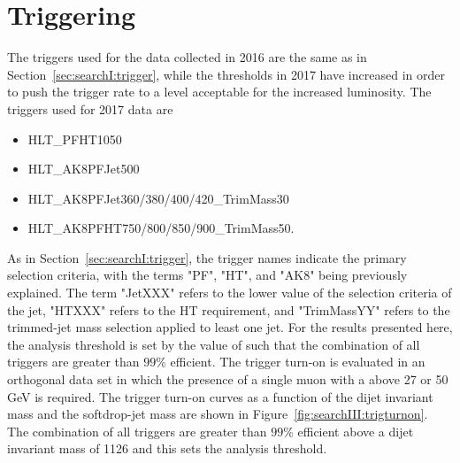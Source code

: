 \section{Triggering}
\label{sec:searchIII:trigger}
The triggers used for the data collected in 2016 are the same as in Section~\ref{sec:searchI:trigger}, while the thresholds in 2017 have increased in order to push the trigger rate to a level acceptable for the increased luminosity. The triggers used for 2017 data are
\begin{itemize}
  \itemsep0em
\item {HLT\_PFHT1050}
\item {HLT\_AK8PFJet500}
\item {HLT\_AK8PFJet360/380/400/420\_TrimMass30}
\item {HLT\_AK8PFHT750/800/850/900\_TrimMass50}.
\end{itemize}
As in Section~\ref{sec:searchI:trigger}, the trigger names indicate the primary selection criteria, with the terms "PF", "HT", and "AK8" being previously explained. The term "JetXXX" refers to the lower value of the \PT selection criteria of the jet, "HTXXX" refers to the HT requirement, and "TrimMassYY" refers to the trimmed-jet mass selection applied to least one jet. For the results presented here, the analysis threshold is set by the value of \MVV such that the combination of all triggers are greater than $99 \%$ efficient. The trigger turn-on is evaluated in an orthogonal data set in which the presence of a single muon with a \PT above 27 or 50 GeV is required. The trigger turn-on curves as a function of the dijet invariant mass and the softdrop-jet mass are shown in Figure~\ref{fig:searchIII:trigturnon}.
The combination of all triggers are greater than $99\%$ efficient above a dijet invariant mass of 1126 \GeV and this sets the analysis threshold. 
